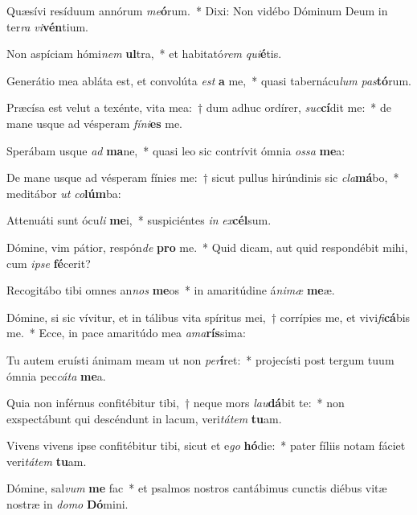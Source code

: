 \item Quæsívi resíduum annórum \textit{me}\textbf{ó}rum.~* Dixi: Non vidébo Dóminum Deum in ter\textit{ra} \textit{vi}\textbf{vén}tium.
\item Non aspíciam hómi\textit{nem} \textbf{ul}tra,~* et habitató\textit{rem} \textit{qui}\textbf{é}tis.
\item Generátio mea abláta est, et convolúta \textit{est} \textbf{a} me,~* quasi tabernácu\textit{lum} \textit{pas}\textbf{tó}rum.
\item Præcísa est velut a texénte, vita mea:~† dum adhuc ordírer, \textit{suc}\textbf{cí}dit me:~* de mane usque ad vésperam \textit{fí}\textit{ni}\textbf{es} me.
\item Sperábam usque \textit{ad} \textbf{ma}ne,~* quasi leo sic contrívit ómnia \textit{os}\textit{sa} \textbf{me}a:
\item De mane usque ad vésperam fínies me:~† sicut pullus hirúndinis sic \textit{cla}\textbf{má}bo,~* meditábor \textit{ut} \textit{co}\textbf{lúm}ba:
\item Attenuáti sunt ócu\textit{li} \textbf{me}i,~* suspiciéntes \textit{in} \textit{ex}\textbf{cél}sum.
\item Dómine, vim pátior, respón\textit{de} \textbf{pro} me.~* Quid dicam, aut quid respondébit mihi, cum \textit{ip}\textit{se} \textbf{fé}cerit?
\item Recogitábo tibi omnes an\textit{nos} \textbf{me}os~* in amaritúdine á\textit{ni}\textit{mæ} \textbf{me}æ.
\item Dómine, si sic vívitur, et in tálibus vita spíritus mei,~† corrípies me, et vivi\textit{fi}\textbf{cá}bis me.~* Ecce, in pace amaritúdo mea \textit{a}\textit{ma}\textbf{rís}sima:
\item Tu autem eruísti ánimam meam ut non \textit{per}\textbf{í}ret:~* projecísti post tergum tuum ómnia pec\textit{cá}\textit{ta} \textbf{me}a.
\item Quia non inférnus confitébitur tibi,~† neque mors \textit{lau}\textbf{dá}bit te:~* non exspectábunt qui descéndunt in lacum, veri\textit{tá}\textit{tem} \textbf{tu}am.
\item Vivens vivens ipse confitébitur tibi, sicut et e\textit{go} \textbf{hó}die:~* pater fíliis notam fáciet veri\textit{tá}\textit{tem} \textbf{tu}am.
\item Dómine, sal\textit{vum} \textbf{me} fac~* et psalmos nostros cantábimus cunctis diébus vitæ nostræ in \textit{do}\textit{mo} \textbf{Dó}mini.
